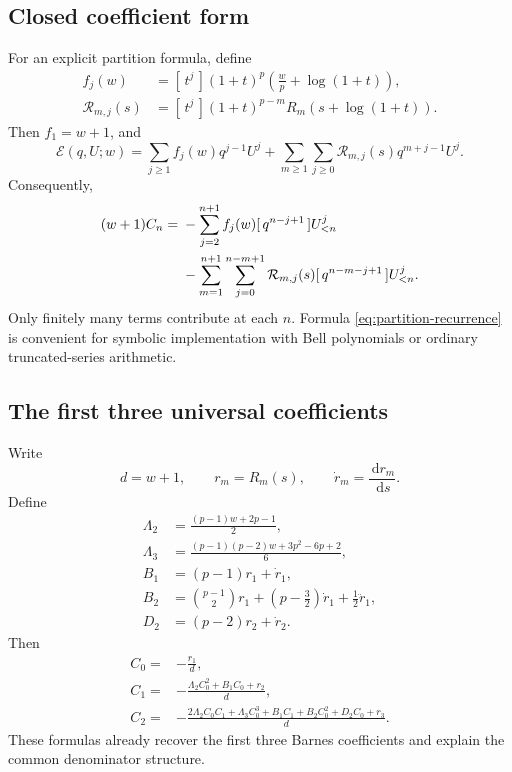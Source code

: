 \documentclass[11pt,a4paper]{article}
\numberwithin{equation}{section}
\theoremstyle{definition}
\theoremstyle{remark}
\newcommand{\dd}{\,\mathrm d}
\newcommand{\coeff}[2]{[\,#1^{#2}\,]}
\begin{document}
\subsection{Closed coefficient form}

For an explicit partition formula, define
\begin{align}
 f_j(w)&=\coeff tj{(1+t)^p\left(\frac wp+\log(1+t)\right)},
 \label{eq:fj-def}\\
 \mathcal R_{m,j}(s)&=\coeff tj{(1+t)^{p-m}
 R_m\!\left(s+\log(1+t)\right)}.
 \label{eq:Rmj-def}
\end{align}
Then \(f_1=w+1\), and
\begin{equation}
 \mathscr E(q,U;w)=
 \sum_{j\ge1}f_j(w)q^{j-1}U^j
 +\sum_{m\ge1}\sum_{j\ge0}\mathcal R_{m,j}(s)
 q^{m+j-1}U^j.
 \label{eq:E-double-series}
\end{equation}
Consequently,
\begin{align}
 (w+1)C_n={}&-
 \sum_{j=2}^{n+1}f_j(w)
 \coeff q{n-j+1}{U_{<n}^j}
 \notag\\
 &-\sum_{m=1}^{n+1}\sum_{j=0}^{n-m+1}
 \mathcal R_{m,j}(s)
 \coeff q{n-m-j+1}{U_{<n}^j}.
 \label{eq:partition-recurrence}
\end{align}
Only finitely many terms contribute at each \(n\).  Formula
\cref{eq:partition-recurrence} is convenient for symbolic implementation
with Bell polynomials or ordinary truncated-series arithmetic.

\subsection{The first three universal coefficients}

Write
\begin{equation}
 d=w+1,
 \qquad r_m=R_m(s),
 \qquad \dot r_m=\frac{\dd r_m}{\dd s}.
 \label{eq:dots}
\end{equation}
Define
\begin{align}
 \Lambda_2&=\frac{(p-1)w+2p-1}{2},
 \label{eq:Lambda2}\\
 \Lambda_3&=\frac{(p-1)(p-2)w+3p^2-6p+2}{6},
 \label{eq:Lambda3}\\
 B_1&=(p-1)r_1+\dot r_1,
 \label{eq:B1}\\
 B_2&=\binom{p-1}{2}r_1
 +\left(p-\frac32\right)\dot r_1+\frac12\ddot r_1,
 \label{eq:B2}\\
 D_2&=(p-2)r_2+\dot r_2.
 \label{eq:D2}
\end{align}
Then
\begin{align}
 C_0={}&-\frac{r_1}{d},
 \label{eq:C0-univ}\\
 C_1={}&-\frac{\Lambda_2C_0^2+B_1C_0+r_2}{d},
 \label{eq:C1-univ}\\
 C_2={}&-\frac{2\Lambda_2C_0C_1+\Lambda_3C_0^3
 +B_1C_1+B_2C_0^2+D_2C_0+r_3}{d}.
 \label{eq:C2-univ}
\end{align}
These formulas already recover the first three Barnes coefficients and
explain the common denominator structure.
\end{document}
